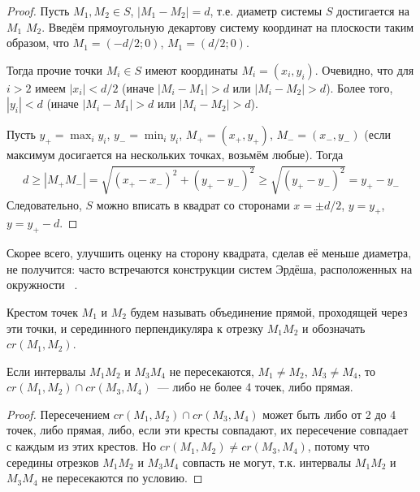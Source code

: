 \begin{proof}
	Пусть $M_1, M_2 \in S$, $|M_1 - M_2| = d$,
	т.е. диаметр системы $S$ достигается на $M_1$  $M_2$.
	Введём прямоугольную декартову систему координат на плоскости таким образом, что
	$M_1 = (-d/2; 0)$, $M_1 = (d/2; 0)$.

	Тогда прочие точки $M_i \in S$ имеют координаты $M_i=(x_i, y_i)$.
	Очевидно, что для $i>2$ имеем $|x_i| < d/2$
	(иначе $|M_i - M_1| > d$ или $|M_i - M_2| > d$).
	Более того, $|y_i| < d$ (иначе $|M_i - M_1| > d$ или $|M_i - M_2| > d$).

	Пусть $y_+ = \max_{i} y_i$, $y_- = \min_{i} y_i$, $M_+=(x_+, y_+)$, $M_-=(x_-, y_-)$
	(если максимум досигается на нескольких точках, возьмём любые).
	Тогда
	\begin{multline}
		d \geq |M_+ M_-| = \sqrt{(x_+ - x_-)^2 + (y_+ - y_-)^2}
		\geq \sqrt{(y_+ - y_-)^2} = y_+ - y_-
	\end{multline}
	Следовательно, $S$ можно вписать в квадрат со сторонами $x=\pm d/2$,
	$y=y_+$, $y=y_+ - d$.
\end{proof}

\begin{remark}
	Скорее всего, улучшить оценку на сторону квадрата, сделав её меньше диаметра,
	не получится: часто встречаются конструкции систем Эрдёша, расположенных на окружности
	~\cite{anning1915discussions,harborth1993upper,piepmeyer1996maximum,kurz2008bounds,our-vvmsh-2018}.
\end{remark}

\begin{definition}
	Крестом точек $M_1$ и $M_2$ будем называть объединение прямой,
	проходящей через эти точки,
	и серединного перпендикуляра к отрезку $M_1 M_2$
	и обозначать $cr(M_1,M_2)$.
\end{definition}

\begin{proposition}
	\label{proposition:intervals_cross}
	Если интервалы $M_1 M_2$ и $M_3 M_4$ не пересекаются,
	$M_1 \neq M_2$, $M_3 \neq M_4$,
	то $cr(M_1,M_2) \cap cr(M_3,M_4)$~--- либо не более 4 точек, либо прямая.
\end{proposition}

\begin{proof}
	Пересечением $cr(M_1,M_2) \cap cr(M_3,M_4)$ может быть либо от 2 до 4 точек, либо прямая,
	либо, если эти кресты совпадают, их пересечение совпадает с каждым из этих крестов.
	Но $cr(M_1,M_2) \neq cr(M_3,M_4)$, потому что середины отрезков $M_1 M_2$ и $M_3 M_4$
	совпасть не могут, т.к. интервалы $M_1 M_2$ и $M_3 M_4$ не пересекаются по условию.
\end{proof}

